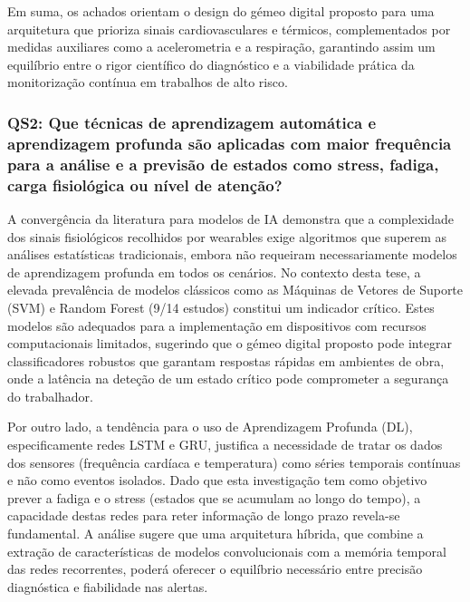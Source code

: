 Em suma, os achados orientam o design do gémeo digital proposto para uma arquitetura que prioriza sinais cardiovasculares e térmicos, complementados por medidas auxiliares como a acelerometria e a respiração, garantindo assim um equilíbrio entre o rigor científico do diagnóstico e a viabilidade prática da monitorização contínua em trabalhos de alto risco.

\subsubsection*{QS2: Que técnicas de aprendizagem automática e aprendizagem profunda são aplicadas com maior frequência para a análise e a previsão de estados como stress, fadiga, carga fisiológica ou nível de atenção?}
\label{subsubsec:qs2_analisis}

A convergência da literatura para modelos de IA demonstra que a complexidade dos sinais fisiológicos recolhidos por wearables exige algoritmos que superem as análises estatísticas tradicionais, embora não requeiram necessariamente modelos de aprendizagem profunda em todos os cenários. No contexto desta tese, a elevada prevalência de modelos clássicos como as Máquinas de Vetores de Suporte (SVM) e Random Forest (9/14 estudos) constitui um indicador crítico. Estes modelos são adequados para a implementação em dispositivos com recursos computacionais limitados, sugerindo que o gémeo digital proposto pode integrar classificadores robustos que garantam respostas rápidas em ambientes de obra, onde a latência na deteção de um estado crítico pode comprometer a segurança do trabalhador.

Por outro lado, a tendência para o uso de Aprendizagem Profunda (DL), especificamente redes LSTM e GRU, justifica a necessidade de tratar os dados dos sensores (frequência cardíaca e temperatura) como séries temporais contínuas e não como eventos isolados. Dado que esta investigação tem como objetivo prever a fadiga e o stress (estados que se acumulam ao longo do tempo), a capacidade destas redes para reter informação de longo prazo revela-se fundamental. A análise sugere que uma arquitetura híbrida, que combine a extração de características de modelos convolucionais com a memória temporal das redes recorrentes, poderá oferecer o equilíbrio necessário entre precisão diagnóstica e fiabilidade nas alertas.

